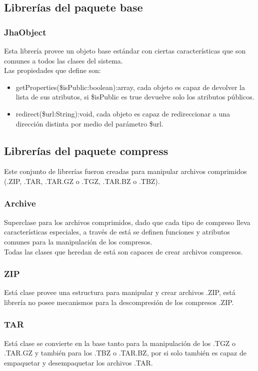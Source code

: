 \subsection{Librer\'ias del paquete \textsf{base}}
\subsubsection{JhaObject}
Esta librer\'ia provee un objeto base est\'andar con ciertas caracter\'isticas que son comunes a todos las clases del sistema.\\Las propiedades que define son: 
\begin{itemize}
\item \textsf{getProperties(\$isPublic:boolean):array}, cada objeto es capaz de devolver la lista de sus atributos, si \textsf{\$isPublic} es \textsf{true} devuelve solo los atributos p\'ublicos.
\item \textsf{redirect(\$url:String):void}, cada objeto es capaz de redireccionar a una direcci\'on distinta por medio del par\'ametro \textsf{\$url}.
\end{itemize}

\subsection{Librer\'ias del paquete \textsf{compress}}
Este conjunto de librer\'ias fueron creadas para manipular archivos comprimidos (.ZIP, .TAR, .TAR.GZ o .TGZ, .TAR.BZ o .TBZ).
\subsubsection{Archive}
Superclase para los archivos comprimidos, dado que cada tipo de compreso lleva caracter\'isticas especiales, a trav\'es de est\'a se definen funciones y atributos comunes para la manipulaci\'on de los compresos.\\Todas las clases que heredan de est\'a son capaces de crear archivos compresos.
\subsubsection{ZIP}
Est\'a clase provee una estructura para manipular y crear archivos .ZIP, est\'a librer\'ia no posee mecanismos para la descompresi\'on de los compresos .ZIP.
\subsubsection{TAR}
Est\'a clase se convierte en la base tanto para la manipulaci\'on de los .TGZ o .TAR.GZ y tambi\'en para los .TBZ o .TAR.BZ, por si solo tambi\'en es capaz de empaquetar y desempaquetar los archivos .TAR.
